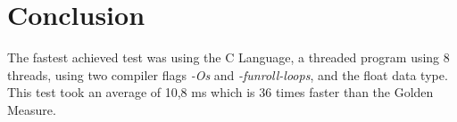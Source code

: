 \section{Conclusion}
The fastest achieved test was using the C Language, a threaded program using 8 threads, using two compiler flags \textit{-Os} and \textit{-funroll-loops}, and the float data type.
This test took an average of 10,8 ms which is 36 times faster than the Golden Measure.
